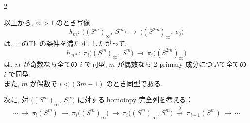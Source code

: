 \documentclass[10pt, leqno]{ltjsarticle} %
\numberwithin{equation}{section}
\theoremstyle{plain}
\theoremstyle{definition}
\theoremstyle{remark}
\begin{document}
\begin{paracol}{2}

以上から, $m>1$ のとき写像
\[
h_m:\ \bigl((S^m)_\infty,\ S^m\bigr)\ \longrightarrow\ \bigl((S^{2m})_\infty,\ e_0\bigr)
\]
は, 上のTh の条件を満たす. したがって,
\[
h_{m*}:\ \pi_i\bigl((S^m)_\infty,\ S^m\bigr)\ \longrightarrow\ \pi_i\bigl((S^{2m})_\infty\bigr)
\]
は, $m$ が奇数なら全ての $i$ で同型, $m$ が偶数なら
2-primary 成分について全ての $i$ で同型. \\
また, $m$ が偶数で \(i<(3m-1)\) のとき同型である.

次に, 対 \(\bigl((S^m)_\infty,\ S^m\bigr)\) に対する homotopy 完全列を考える：
\begin{equation}\label{2.8}
\cdots\ \to\ \pi_i(S^m)\ \to\ \pi_i\bigl((S^m)_\infty\bigr)\ \to\
\pi_i\bigl((S^m)_\infty,\ S^m\bigr)\ \xrightarrow{\ \partial\ }\ \pi_{i-1}(S^m)\ \to\ \cdots
\tag{2.8}
\end{equation}

\end{paracol}
\end{document}
